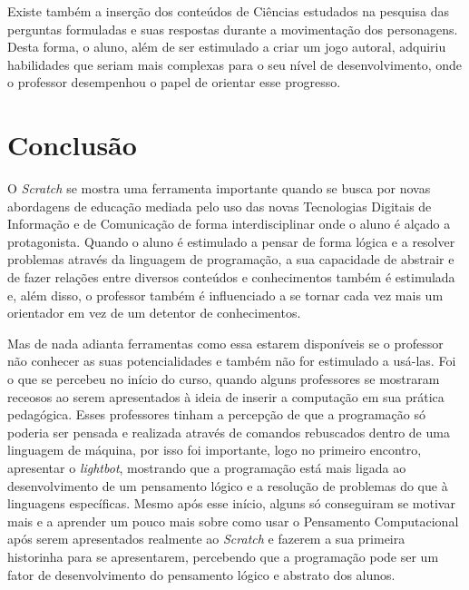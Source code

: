 \documentclass[12pt, openright, a4paper, brazil, english, french, spanish, bibjustif, openany, oneside]{abntex2}
\begin{document}
Existe também a inserção dos conteúdos de Ciências estudados na pesquisa das perguntas formuladas e suas respostas durante a movimentação dos personagens. Desta forma, o aluno, além de ser estimulado a criar um jogo autoral, adquiriu habilidades que seriam mais complexas para o seu nível de desenvolvimento, onde o professor desempenhou o papel de orientar esse progresso.



\chapter{Conclusão}


O \textit{Scratch} se mostra uma ferramenta importante quando se busca por novas abordagens de educação mediada pelo uso das novas Tecnologias Digitais de  Informação e de Comunicação de forma interdisciplinar onde o aluno é alçado a protagonista. Quando o aluno é estimulado a pensar de forma lógica e a resolver problemas através da linguagem de programação, a sua capacidade de abstrair e de fazer relações entre diversos conteúdos e conhecimentos também é estimulada e, além disso, o professor também é influenciado a se tornar cada vez mais um orientador em vez de um detentor de conhecimentos.

Mas de nada adianta ferramentas como essa estarem disponíveis se o professor não conhecer as suas potencialidades e também não for estimulado a usá-las. Foi o que se percebeu no início do curso, quando alguns professores se mostraram receosos ao serem apresentados à ideia de inserir a computação em sua prática pedagógica. Esses professores tinham a percepção de que a programação só poderia ser pensada e realizada através de comandos rebuscados dentro de uma linguagem de máquina, por isso foi importante, logo no primeiro encontro, apresentar o \textit{lightbot}, mostrando que a programação está mais ligada ao desenvolvimento de um pensamento lógico e a resolução de problemas do que à linguagens específicas. Mesmo após esse início, alguns só conseguiram se motivar mais e a aprender um pouco mais sobre como usar o Pensamento Computacional após serem apresentados realmente ao \textit{Scratch} e fazerem a sua primeira historinha para se apresentarem, percebendo que a programação pode ser um fator de desenvolvimento do pensamento lógico e abstrato dos alunos.
\end{document}
